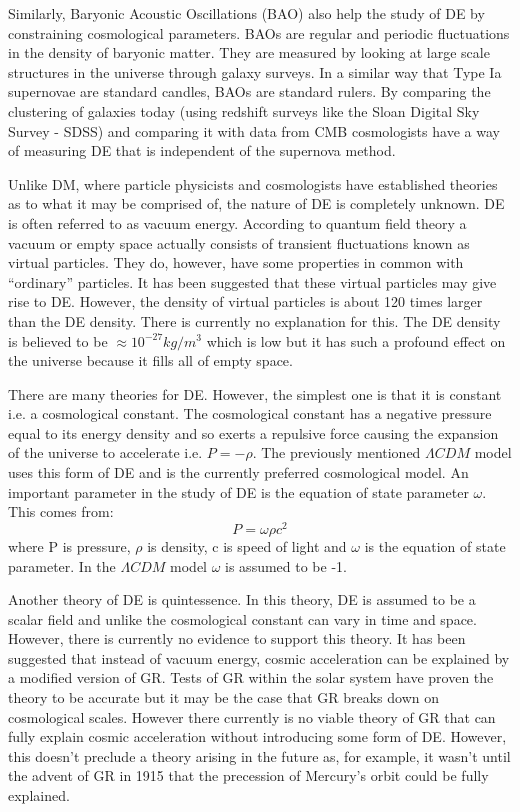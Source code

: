 \documentclass[a4paper,12pt]{article}
\begin{document}
Similarly, Baryonic Acoustic Oscillations (BAO) also
help the study of DE by constraining cosmological parameters. BAOs are regular and periodic fluctuations in the density of baryonic matter. They are measured by looking at large
scale structures in the universe through galaxy surveys. In a similar way that Type Ia supernovae
are standard candles, BAOs are standard rulers. By comparing the clustering of galaxies today (using redshift surveys like the Sloan Digital Sky Survey - SDSS) and comparing it with
data from CMB cosmologists have a way of measuring DE that is independent of the supernova method.

Unlike DM, where particle physicists and cosmologists have established theories as to what it may be comprised of, the nature of DE is completely unknown. DE is often referred to as
vacuum energy. According to quantum field theory a vacuum or empty space actually consists of transient fluctuations known as virtual particles. 
They do, however, have some properties in common with ``ordinary'' particles.
It has been suggested that these virtual particles may give
rise to DE. However, the density of virtual particles is about 120 times larger than the DE density. There is currently no explanation for this. The DE density is believed
to be $\approx10^{-27}kg/m^3$ which is low but it has such a profound effect on the universe because it fills all of empty space.

There are many theories for DE. However, the simplest one is that it is constant i.e. a cosmological constant. The cosmological constant has a negative pressure equal to
its energy density and so exerts a repulsive force causing the expansion of the universe to accelerate i.e. $P=-\rho$. The previously mentioned $\Lambda CDM$ model uses
this form of DE and is the currently preferred cosmological model. An important parameter in the study of DE is the equation of state parameter $\omega$. This comes from: 
\begin{equation}
P=\omega\rho c^2
\end{equation}
where P is pressure, $\rho$ is density, c is speed of light and $\omega$ is the equation of state parameter.
In the $\Lambda CDM$ model $\omega$ is assumed to be -1.

Another theory of DE is quintessence. In this theory, DE is assumed to be a scalar field and unlike the 
cosmological constant can vary in time and space. However, there is currently no evidence to support this theory.
It has been suggested that instead of vacuum energy, cosmic acceleration can be explained by a modified version of GR. Tests of GR within the solar system have proven the theory
to be accurate but it may be the case that GR breaks down on cosmological scales. However there currently is no viable theory of GR that can fully explain cosmic acceleration
without introducing some form of DE. However, this doesn't preclude a theory arising in the future as, for example, it wasn't until the advent of GR in 1915 that the precession
of Mercury's orbit could be fully explained.
\end{document}
